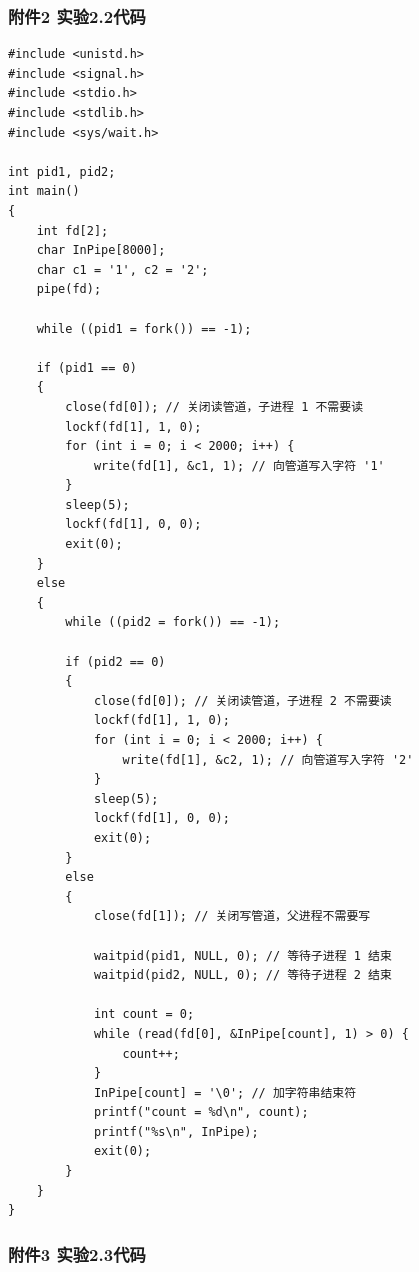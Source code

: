 \documentclass{article}
\begin{document}
    \subsubsection{附件2 实验2.2代码}

    \lstset{language=C}
    \begin{lstlisting}
#include <unistd.h>
#include <signal.h>
#include <stdio.h>
#include <stdlib.h> 
#include <sys/wait.h>

int pid1, pid2;
int main()
{
    int fd[2];
    char InPipe[8000];
    char c1 = '1', c2 = '2';
    pipe(fd);

    while ((pid1 = fork()) == -1);

    if (pid1 == 0)
    {
        close(fd[0]); // 关闭读管道，子进程 1 不需要读
        lockf(fd[1], 1, 0);
        for (int i = 0; i < 2000; i++) {
            write(fd[1], &c1, 1); // 向管道写入字符 '1'
        }
        sleep(5);
        lockf(fd[1], 0, 0);
        exit(0);
    }
    else
    {
        while ((pid2 = fork()) == -1);

        if (pid2 == 0)
        {
            close(fd[0]); // 关闭读管道，子进程 2 不需要读
            lockf(fd[1], 1, 0);
            for (int i = 0; i < 2000; i++) {
                write(fd[1], &c2, 1); // 向管道写入字符 '2'
            }
            sleep(5);
            lockf(fd[1], 0, 0);
            exit(0);
        }
        else
        {
            close(fd[1]); // 关闭写管道，父进程不需要写

            waitpid(pid1, NULL, 0); // 等待子进程 1 结束
            waitpid(pid2, NULL, 0); // 等待子进程 2 结束

            int count = 0;
            while (read(fd[0], &InPipe[count], 1) > 0) {
                count++;
            }
            InPipe[count] = '\0'; // 加字符串结束符
            printf("count = %d\n", count);
            printf("%s\n", InPipe);
            exit(0);
        }
    }
}

    \end{lstlisting}

    \subsubsection{附件3 实验2.3代码}
\end{document}
